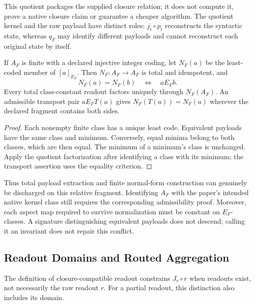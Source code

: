 This quotient packages the supplied closure relation; it does not
compute it, prove a native closure claim or guarantee a cheaper
algorithm. The quotient kernel and the raw payload have distinct
roles: $j_t\circ p_t$ reconstructs the syntactic state, whereas
$q_F$ may identify different payloads and cannot reconstruct each
original state by itself.

\begin{proposition}
\label{v480:kernel-finite-normal-form}
If $A_F$ is finite with a declared injective integer coding, let
$N_F(a)$ be the least-coded member of $[a]_{E_F}$. Then
$N_F:A_F\to A_F$ is total and idempotent, and
\[
 N_F(a)=N_F(b)\quad\Longleftrightarrow\quad aE_Fb.
\]
Every total class-constant readout factors uniquely through
$N_F(A_F)$. An admissible transport pair $aE_FT(a)$ gives
$N_F(T(a))=N_F(a)$ wherever the declared fragment contains both sides.
\end{proposition}
\begin{proof}
Each nonempty finite class has a unique least code. Equivalent
payloads have the same class and minimum. Conversely, equal minima
belong to both classes, which are then equal. The minimum of a
minimum's class is unchanged. Apply the quotient factorization
after identifying a class with its minimum; the transport assertion
uses the equality criterion.
\end{proof}

Thus total payload extraction and finite normal-form construction
can genuinely be discharged on this relative fragment. Identifying
$A_F$ with the paper's intended native kernel class still requires
the corresponding admissibility proof. Moreover, each aspect map
required to survive normalization must be constant on $E_F$-classes.
A signature distinguishing equivalent payloads does not descend;
calling it an invariant does not repair this conflict.

\subsection{Readout Domains and Routed Aggregation}
\label{v480:kernel-factor-and-route}

The definition of closure-compatible readout constrains $J_r\circ r$
when readouts exist, not necessarily the raw readout $r$. For a
partial readout, this distinction also includes its domain.

